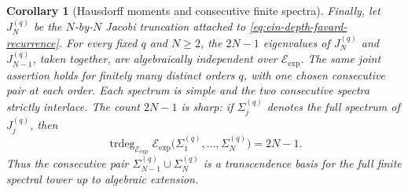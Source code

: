 \documentclass[11pt]{article}
\newtheorem{corollary}[theorem]{Corollary}
\theoremstyle{definition}
\theoremstyle{remark}
\newcommand{\Eexp}{\mathcal E_{\mathrm{exp}}}
\begin{document}
\begin{corollary}[Hausdorff moments and consecutive finite spectra]
Finally, let \(J_N^{(q)}\) be the \(N\)-by-\(N\) Jacobi truncation attached
to \eqref{eq:ein-depth-favard-recurrence}.  For every fixed \(q\) and
\(N\geq2\), the \(2N-1\) eigenvalues of
\(J_N^{(q)}\) and \(J_{N-1}^{(q)}\), taken together, are algebraically
independent over \(\Eexp\).  The same joint assertion holds for finitely
many distinct orders \(q\), with one chosen consecutive pair at each
order.  Each spectrum is simple and the two consecutive spectra strictly
interlace.  The count \(2N-1\) is sharp: if \(\Sigma_j^{(q)}\) denotes
the full spectrum of \(J_j^{(q)}\), then
\begin{equation}\label{eq:ein-depth-full-finite-spectral-rank}
 \operatorname{trdeg}_{\Eexp}
 \Eexp\bigl(\Sigma_1^{(q)},\ldots,\Sigma_N^{(q)}\bigr)=2N-1.
\end{equation}
Thus the consecutive pair
\(\Sigma_{N-1}^{(q)}\cup\Sigma_N^{(q)}\) is a transcendence basis for
the full finite spectral tower up to algebraic extension.
\end{corollary}
\end{document}
